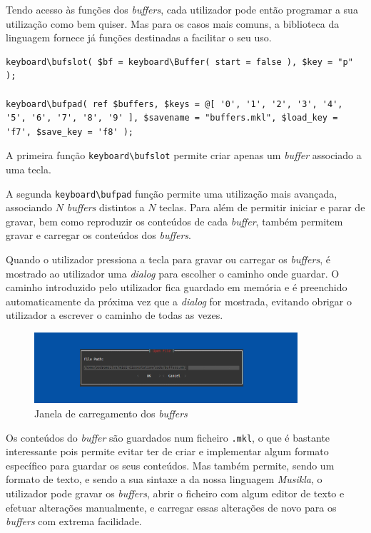 Tendo acesso às funções dos \textit{buffers}, cada utilizador pode então programar a sua utilização como bem quiser. Mas para os casos mais comuns, a biblioteca da linguagem fornece já funções destinadas a facilitar o seu uso.

\begin{lstlisting}[caption={Funções disponibilizadas para criação de \textit{buffers} controlados por teclados.}]
keyboard\bufslot( $bf = keyboard\Buffer( start = false ), $key = "p" );

keyboard\bufpad( ref $buffers, $keys = @[ '0', '1', '2', '3', '4', '5', '6', '7', '8', '9' ], $savename = "buffers.mkl", $load_key = 'f7', $save_key = 'f8' );
\end{lstlisting}

A primeira função \texttt{keyboard\textbackslash{}bufslot} permite criar apenas um \textit{buffer} associado a uma tecla.

A segunda \texttt{keyboard\textbackslash{}bufpad} função permite uma utilização mais avançada, associando $N$ \textit{buffers} distintos a $N$ teclas. Para além de permitir iniciar e parar de gravar, bem como reproduzir os conteúdos de cada \textit{buffer}, também permitem gravar e carregar os conteúdos dos \textit{buffers}.

Quando o utilizador pressiona a tecla para gravar ou carregar os \textit{buffers}, é mostrado ao utilizador uma \textit{dialog} para escolher o caminho onde guardar. O caminho introduzido pelo utilizador fica guardado em memória e é preenchido automaticamente da próxima vez que a \textit{dialog} for mostrada, evitando obrigar o utilizador a escrever o caminho de todas as vezes.

\begin{figure}[h]
\begin{center}
    \includegraphics[width=0.87\textwidth]{img/open_buffers_dialog.png}
\end{center}
\caption{Janela de carregamento dos \textit{buffers}}
\end{figure}

Os conteúdos do \textit{buffer} são guardados num ficheiro \texttt{.mkl}, o que é bastante interessante pois permite evitar ter de criar e implementar algum formato específico para guardar os seus conteúdos. Mas também permite, sendo um formato de texto, e sendo a sua sintaxe a da nossa linguagem \textit{Musikla}, o utilizador pode gravar os \textit{buffers}, abrir o ficheiro com algum editor de texto e efetuar alterações manualmente, e carregar essas alterações de novo para os \textit{buffers} com extrema facilidade.

